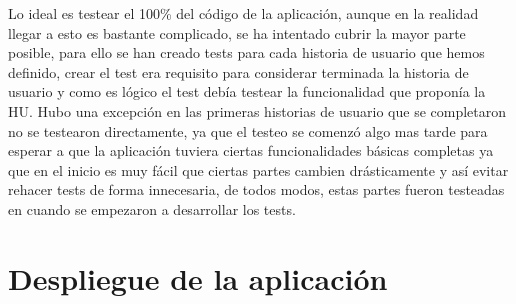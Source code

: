 Lo ideal es testear el 100\% del código de la aplicación, aunque en la realidad llegar a esto
es bastante complicado, se ha intentado cubrir la mayor parte posible, para ello se han creado
tests para cada historia de usuario que hemos definido, crear el test era requisito para considerar
terminada la historia de usuario y como es lógico el test debía testear la funcionalidad que 
proponía la HU. Hubo una excepción en las primeras historias de usuario que se completaron
no se testearon directamente, ya que el testeo se comenzó algo mas tarde para esperar a 
que la aplicación tuviera ciertas funcionalidades básicas completas ya que en el inicio es
muy fácil que ciertas partes cambien drásticamente y así evitar rehacer tests de forma innecesaria,
de todos modos, estas partes fueron testeadas en cuando se empezaron a desarrollar los tests.

\newpage
\section{Despliegue de la aplicación}

